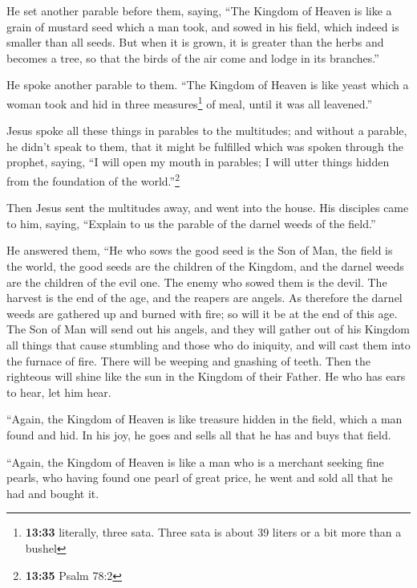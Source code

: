  He set another parable before them, saying, ``The
Kingdom of Heaven is like a grain of mustard seed which a man took, and
sowed in his field,  which indeed is smaller than all
seeds. But when it is grown, it is greater than the herbs and becomes a
tree, so that the birds of the air come and lodge in its branches.''

 He spoke another parable to them. ``The Kingdom of
Heaven is like yeast which a woman took and hid in three
measures\footnote{\textbf{13:33} literally, three sata. Three sata is
  about 39 liters or a bit more than a bushel} of meal, until it was all
leavened.''

 Jesus spoke all these things in parables to the
multitudes; and without a parable, he didn't speak to them,
 that it might be fulfilled which was spoken through the
prophet, saying, ``I will open my mouth in parables; I will utter things
hidden from the foundation of the world.''\footnote{\textbf{13:35} Psalm
  78:2}

 Then Jesus sent the multitudes away, and went into the
house. His disciples came to him, saying, ``Explain to us the parable of
the darnel weeds of the field.''

 He answered them, ``He who sows the good seed is the Son
of Man,  the field is the world, the good seeds are the
children of the Kingdom, and the darnel weeds are the children of the
evil one.  The enemy who sowed them is the devil. The
harvest is the end of the age, and the reapers are angels.
 As therefore the darnel weeds are gathered up and burned
with fire; so will it be at the end of this age.  The Son
of Man will send out his angels, and they will gather out of his Kingdom
all things that cause stumbling and those who do iniquity,
 and will cast them into the furnace of fire. There will
be weeping and gnashing of teeth.  Then the righteous
will shine like the sun in the Kingdom of their Father. He who has ears
to hear, let him hear.

 ``Again, the Kingdom of Heaven is like treasure hidden
in the field, which a man found and hid. In his joy, he goes and sells
all that he has and buys that field.

 ``Again, the Kingdom of Heaven is like a man who is a
merchant seeking fine pearls,  who having found one pearl
of great price, he went and sold all that he had and bought it.

